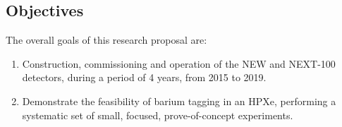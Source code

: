 \subsection*{Objectives}


The overall goals of this research proposal are:

\begin{enumerate}
\item Construction, commissioning and operation of the NEW and NEXT-100 detectors, during a period of 4 years, from 2015 to 2019.
\item Demonstrate the feasibility of barium tagging in an HPXe, performing a systematic set of small, focused, prove-of-concept experiments. 
\end{enumerate}
  



